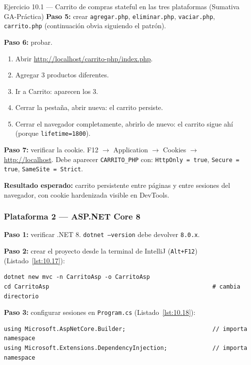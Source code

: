 \documentclass[11pt,a4paper,openany]{book}
\begin{document}
\begin{cajaejercicio}{Ejercicio 10.1 --- Carrito de compras stateful en las tres plataformas (Sumativa GA-Práctica)}
\textbf{Paso 5:} crear \texttt{agregar.php}, \texttt{eliminar.php},
\texttt{vaciar.php}, \texttt{carrito.php} (continuación obvia siguiendo
el patrón).

\textbf{Paso 6:} probar.
\begin{enumerate}
\item Abrir \url{http://localhost/carrito-php/index.php}.
\item Agregar 3 productos diferentes.
\item Ir a Carrito: aparecen los 3.
\item Cerrar la pestaña, abrir nueva: el carrito persiste.
\item Cerrar el navegador completamente, abrirlo de nuevo: el carrito
sigue ahí (porque \texttt{lifetime=1800}).
\end{enumerate}

\textbf{Paso 7:} verificar la cookie. F12 $\rightarrow$ Application
$\rightarrow$ Cookies $\rightarrow$ \url{http://localhost}. Debe
aparecer \texttt{CARRITO\_PHP} con: \texttt{HttpOnly = true},
\texttt{Secure = true}, \texttt{SameSite = Strict}.

\textbf{Resultado esperado:} carrito persistente entre páginas y entre
sesiones del navegador, con cookie hardenizada visible en DevTools.

\subsubsection*{Plataforma 2 --- ASP.NET Core 8}

\textbf{Paso 1:} verificar .NET 8. \texttt{dotnet --version} debe
devolver \texttt{8.0.x}.

\textbf{Paso 2:} crear el proyecto desde la terminal de IntelliJ
(\texttt{Alt+F12}) (Listado~\ref{lst:10.17}):
\begin{lstlisting}[style=shell,numbers=none,caption={Ejemplo de Shell},label=lst:10.17]
dotnet new mvc -n CarritoAsp -o CarritoAsp
cd CarritoAsp                                               # cambia directorio
\end{lstlisting}

\textbf{Paso 3:} configurar sesiones en \texttt{Program.cs} (Listado~\ref{lst:10.18}):

\begin{lstlisting}[style=cs,caption={Program.cs},label=lst:10.18]
using Microsoft.AspNetCore.Builder;                         // importa namespace
using Microsoft.Extensions.DependencyInjection;             // importa namespace


\end{lstlisting}
\end{cajaejercicio}
\end{document}
